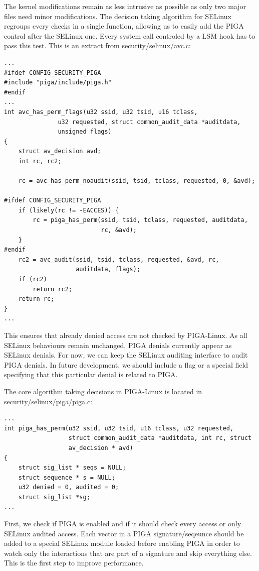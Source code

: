 \documentclass[pdftex,a4paper,titlepage,11pt]{article}
\begin{document}
\bigskip

The kernel modifications remain as less intrusive as possible as only two
major files need minor modifications. The decision taking algorithm for SELinux
regroups every checks in a single function, allowing us to easily add the PIGA
control after the SELinux one. Every system call controled by a LSM hook has
to pass this test. This is an extract from security/selinux/avc.c:

\begin{lstlisting}
...
#ifdef CONFIG_SECURITY_PIGA
#include "piga/include/piga.h"
#endif
...
int avc_has_perm_flags(u32 ssid, u32 tsid, u16 tclass,
		       u32 requested, struct common_audit_data *auditdata,
		       unsigned flags)
{
	struct av_decision avd;
	int rc, rc2;

	rc = avc_has_perm_noaudit(ssid, tsid, tclass, requested, 0, &avd);

#ifdef CONFIG_SECURITY_PIGA
	if (likely(rc != -EACCES)) {
		rc = piga_has_perm(ssid, tsid, tclass, requested, auditdata,
						   rc, &avd);
	}
#endif
	rc2 = avc_audit(ssid, tsid, tclass, requested, &avd, rc,
					auditdata, flags);
	if (rc2)
		return rc2;
	return rc;
}
...
\end{lstlisting}

\medskip

This ensures that already denied access are not checked by PIGA-Linux. As all
SELinux behaviours remain unchanged, PIGA denials currently appear as SELinux
denials. For now, we can keep the SELinux auditing interface to audit PIGA
denials. In future development, we should include a flag or a special field
specifying that this particular denial is related to PIGA.

\bigskip

The core algorithm taking decisions in PIGA-Linux is located in
security/selinux/piga/piga.c:

\begin{lstlisting}
...
int piga_has_perm(u32 ssid, u32 tsid, u16 tclass, u32 requested,
				  struct common_audit_data *auditdata, int rc, struct
				  av_decision * avd)
{
	struct sig_list * seqs = NULL;
	struct sequence * s = NULL;
	u32 denied = 0, audited = 0;
	struct sig_list *sg;
...
\end{lstlisting}

\medskip

First, we check if PIGA is enabled and if it should check every access or
only SELinux audited access. Each vector in a PIGA signature/seqeunce should be
added to a special SELinux module loaded before enabling PIGA in order to watch
only the interactions that are part of a signature and skip everything else.
This is the first step to improve performance.
\end{document}
